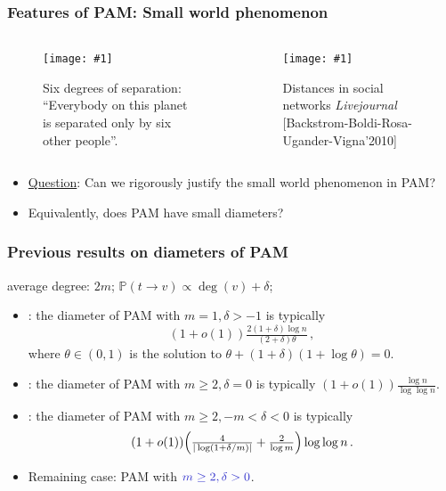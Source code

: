 \documentclass{beamer}
\theoremstyle{plain}
\theoremstyle{definition}
\let\originalleft\left
\let\originalright\right
\renewcommand{\left}{\mathopen{}\mathclose\bgroup\originalleft}
\renewcommand{\right}{\aftergroup\egroup\originalright}
\newcommand{\post}[2]{\begin{center} \texttt{[image: \#1]} \end{center} }
\begin{document}
\begin{frame}
\frametitle{Features of PAM: Small world phenomenon}
\begin{columns}
    \begin{column}{0.5\textwidth}
        \begin{figure}
        \begin{centering}
        \post{Six_Degree_Separ.jpeg}{1.4in}
        \caption{Six degrees of separation: ``{\color{bgr}Everybody} on this planet is separated only by six other people''.}
        \end{centering}
        \end{figure}
    \end{column}
    \begin{column}{0.5\textwidth}
        \begin{figure}
        \begin{centering}
        \post{Dist_Real_Network.jpeg}{1.8in}
        \caption{Distances in social networks \emph{Livejournal} {\color{red}[Backstrom-Boldi-Rosa-Ugander-Vigna'2010]} }
        \end{centering}
        \end{figure}
    \end{column}
\end{columns}
\begin{itemize}
    \item \pause \underline{Question}: Can we rigorously justify the small world phenomenon in PAM?
    \item \pause Equivalently, does PAM have small {\color{bgr}diameters}?
\end{itemize}
\end{frame}





\begin{frame}
\frametitle{Previous results on diameters of PAM}
\quad average degree: $2m$; \quad\quad $\mathbb P(t\to v)\varpropto \operatorname{deg}(v)+\delta$;
\begin{itemize}
    \item \pause {\color{rgr}[Pittel'94]}: the diameter of PAM with $m=1,\delta>-1$ is typically 
    \[
    (1+o(1))\tfrac{2(1+\delta)\log n}{(2+\delta)\theta} \,,
    \]
    where $\theta \in (0,1)$ is the solution to $\theta+(1+\delta)(1+\log\theta) = 0$.
    \item {}: the diameter of PAM with $m\geq 2,\delta=0$ is typically $(1+o(1))\tfrac{\log n}{\log\log n}$.
    \item {}: the diameter of PAM with $m\geq 2,-m<\delta<0$ is typically 
    \[
    (1 + o(1)) \left( \tfrac{4}{|\log(1 + \delta/m)|} + \tfrac{2}{\log m} \right) \log\log n \,.
    \]
    \item \pause Remaining case: PAM with ${\color{bgr}m\geq 2, \delta>0}$.
\end{itemize}
\end{frame}
\end{document}
